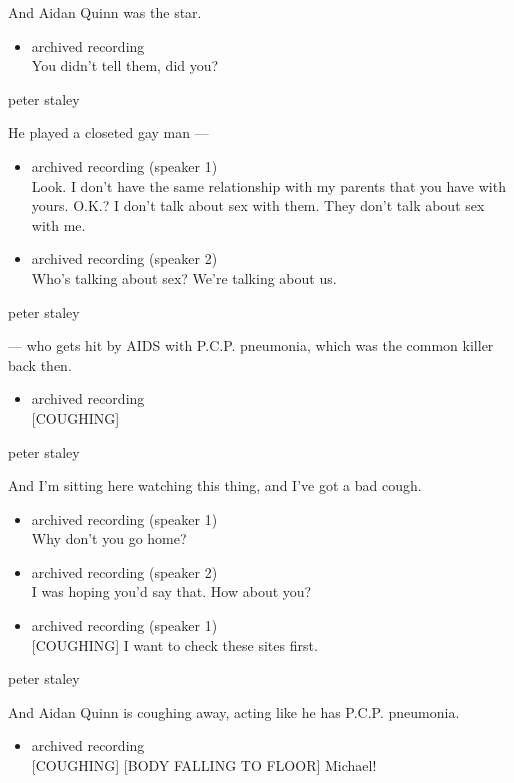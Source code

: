 And Aidan Quinn was the star.

\begin{itemize}
\tightlist
\item
  archived recording\\
  You didn't tell them, did you?
\end{itemize}

peter staley

He played a closeted gay man ---

\begin{itemize}
\item
  archived recording (speaker 1)\\
  Look. I don't have the same relationship with my parents that you have
  with yours. O.K.? I don't talk about sex with them. They don't talk
  about sex with me.
\item
  archived recording (speaker 2)\\
  Who's talking about sex? We're talking about us.
\end{itemize}

peter staley

--- who gets hit by AIDS with P.C.P. pneumonia, which was the common
killer back then.

\begin{itemize}
\tightlist
\item
  archived recording\\
  {[}COUGHING{]}
\end{itemize}

peter staley

And I'm sitting here watching this thing, and I've got a bad cough.

\begin{itemize}
\item
  archived recording (speaker 1)\\
  Why don't you go home?
\item
  archived recording (speaker 2)\\
  I was hoping you'd say that. How about you?
\item
  archived recording (speaker 1)\\
  {[}COUGHING{]} I want to check these sites first.
\end{itemize}

peter staley

And Aidan Quinn is coughing away, acting like he has P.C.P. pneumonia.

\begin{itemize}
\tightlist
\item
  archived recording\\
  {[}COUGHING{]} {[}BODY FALLING TO FLOOR{]} Michael!
\end{itemize}

